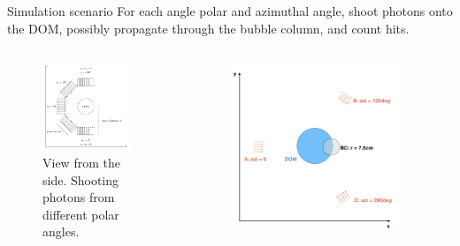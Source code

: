 \begin{frame}[fragile]{Simulation scenario}
  For each angle polar and azimuthal angle, shoot photons onto the DOM, possibly propagate through the bubble column, and count hits.

  \begin{columns}
    \begin{column}{0.5\textwidth}
      \begin{figure}
        \includegraphics[width=0.9\textwidth]{img/angular-acceptance-coordinates-plane-waves-Ii2nieki}
        \caption{View from the side. Shooting photons from different polar angles.}
      \end{figure}
    \end{column}
    \begin{column}{0.5\textwidth}
      \begin{figure}
        \includegraphics[width=0.9\textwidth]{img/summerscenario-003}

\end{figure}
\end{column}
\end{columns}
\end{frame}
